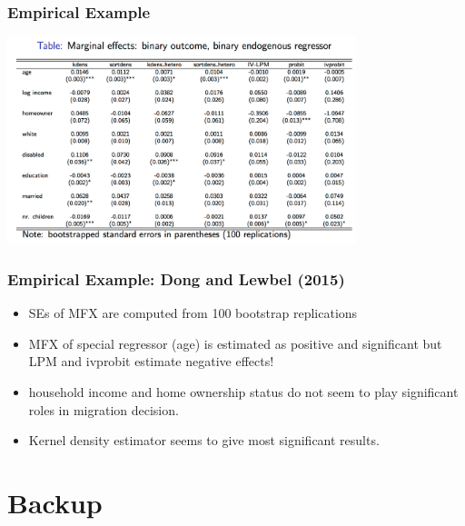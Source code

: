 \begin{frame}
\frametitle{Empirical Example}
\begin{center}
\includegraphics[width=4in]{resources/specialregtable.png}
\end{center}
\end{frame}

\begin{frame}
\frametitle{Empirical Example: Dong and Lewbel (2015)}

\begin{itemize}
\item SEs of MFX are computed from 100 bootstrap replications
\item MFX of special regressor (age) is estimated as positive and significant but LPM and ivprobit estimate negative effects!
\item household income and home ownership status do not seem to play significant roles in migration decision.
\item Kernel density estimator seems to give most significant results.
\end{itemize}
\end{frame}


\begin{frame}[allowframebreaks]
       
       
\end{frame}

\section*{Backup}
          

